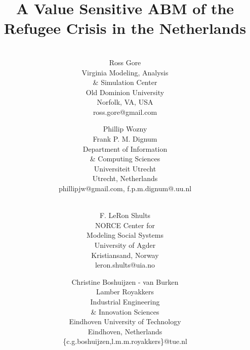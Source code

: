 \documentclass{scspaperproc}
\theoremstyle{scsthe}
\begin{document}
\title{A Value Sensitive ABM of the Refugee Crisis in the Netherlands}

\author{
\\%
Ross Gore \\ [12pt]
Virginia Modeling, Analysis \\ \& Simulation Center \\
Old Dominion University \\
Norfolk, VA, USA \\
ross.gore@gmail.com\\
\and
Phillip Wozny \\
Frank P. M. Dignum \\ [12pt]
Department of Information \\ \& Computing Sciences \\
Universiteit Utrecht \\
Utrecht, Netherlands \\
phillipjw@gmail.com, f.p.m.dignum@.uu.nl \\
\and
\\%
F. LeRon Shults \\ [12pt]
NORCE Center for \\ Modeling Social Systems \\
University of Agder \\
Kristiansand, Norway \\
leron.shults@uia.no \\
\and
Christine Boshuijzen - van Burken \\ 
Lamber Royakkers \\ [12pt]
Industrial Engineering \\ \& Innovation Sciences \\
Eindhoven University of Technology \\
Eindhoven, Netherlands \\
\{c.g.boshuijzen,l.m.m.royakkers\}@tue.nl
}
\end{document}
